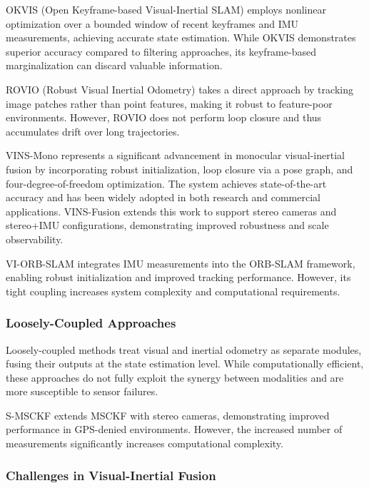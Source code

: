 OKVIS (Open Keyframe-based Visual-Inertial SLAM) \cite{Leutenegger2015} employs nonlinear optimization over a bounded window of recent keyframes and IMU measurements, achieving accurate state estimation.
While OKVIS demonstrates superior accuracy compared to filtering approaches, its keyframe-based marginalization can discard valuable information.

ROVIO (Robust Visual Inertial Odometry) \cite{Bloesch2015} takes a direct approach by tracking image patches rather than point features, making it robust to feature-poor environments.
However, ROVIO does not perform loop closure and thus accumulates drift over long trajectories.

VINS-Mono \cite{Qin2018} represents a significant advancement in monocular visual-inertial fusion by incorporating robust initialization, loop closure via a pose graph, and four-degree-of-freedom optimization.
The system achieves state-of-the-art accuracy and has been widely adopted in both research and commercial applications.
VINS-Fusion \cite{Qin2019} extends this work to support stereo cameras and stereo+IMU configurations, demonstrating improved robustness and scale observability.

VI-ORB-SLAM \cite{MurArtal2017} integrates IMU measurements into the ORB-SLAM framework, enabling robust initialization and improved tracking performance.
However, its tight coupling increases system complexity and computational requirements.

\subsubsection{Loosely-Coupled Approaches}

Loosely-coupled methods treat visual and inertial odometry as separate modules, fusing their outputs at the state estimation level.
While computationally efficient, these approaches do not fully exploit the synergy between modalities and are more susceptible to sensor failures.

S-MSCKF \cite{Sun2018} extends MSCKF with stereo cameras, demonstrating improved performance in GPS-denied environments.
However, the increased number of measurements significantly increases computational complexity.

\subsubsection{Challenges in Visual-Inertial Fusion}

